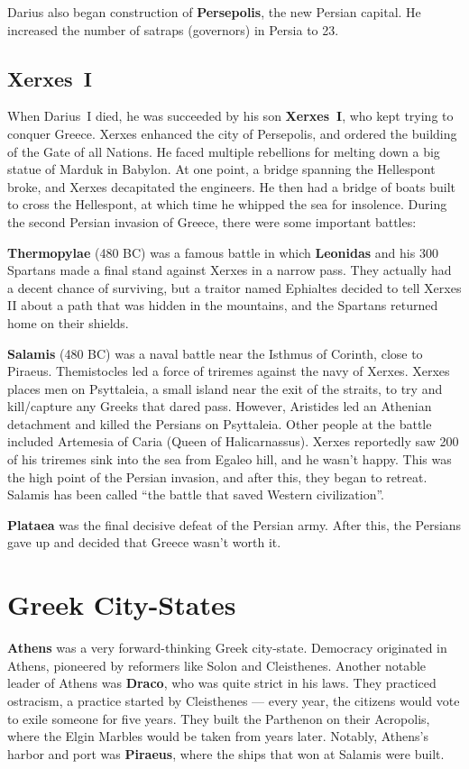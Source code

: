 Darius also began construction of \textbf{Persepolis}, the new Persian capital.
He increased the number of satraps (governors) in Persia to 23.

\subsection*{Xerxes~I}

When Darius~I died, he was succeeded by his son \textbf{Xerxes~I}, who kept trying to conquer Greece.
Xerxes enhanced the city of Persepolis, and ordered the building of the Gate of all Nations.
He faced multiple rebellions for melting down a big statue of Marduk in Babylon.
At one point, a bridge spanning the Hellespont broke, and Xerxes decapitated the engineers.
He then had a bridge of boats built to cross the Hellespont,
at which time he whipped the sea for insolence.
During the second Persian invasion of Greece, there were some important battles:

\textbf{Thermopylae} (480 BC) was a famous battle in which \textbf{Leonidas} and his 300 Spartans
made a final stand against Xerxes in a narrow pass.
They actually had a decent chance of surviving,
but a traitor named Ephialtes decided to tell Xerxes II about a path that
was hidden in the mountains, and the Spartans returned home on their shields.

\textbf{Salamis} (480 BC) was a naval battle near the Isthmus of Corinth, close to Piraeus.
Themistocles led a force of triremes against the navy of Xerxes.
Xerxes places men on Psyttaleia, a small island near the exit of the straits,
to try and kill/capture any Greeks that dared pass.
However, Aristides led an Athenian detachment and killed the Persians on Psyttaleia.
Other people at the battle included Artemesia of Caria (Queen of Halicarnassus).
Xerxes reportedly saw 200 of his triremes sink into the sea from Egaleo hill, and he wasn't happy.
This was the high point of the Persian invasion, and after this, they began to retreat.
Salamis has been called ``the battle that saved Western civilization''.

\textbf{Plataea} was the final decisive defeat of the Persian army.
After this, the Persians gave up and decided that Greece wasn't worth it.

\section{Greek City-States}

\textbf{Athens} was a very forward-thinking Greek city-state.
Democracy originated in Athens, pioneered by reformers like Solon and Cleisthenes.
Another notable leader of Athens was \textbf{Draco}, who was quite strict in his laws.
They practiced ostracism, a practice started by Cleisthenes ---
every year, the citizens would vote to exile someone for five years.
They built the Parthenon on their Acropolis, where the Elgin Marbles would be taken from years later.
Notably, Athens's harbor and port was \textbf{Piraeus}, where the ships that won at Salamis were built.

